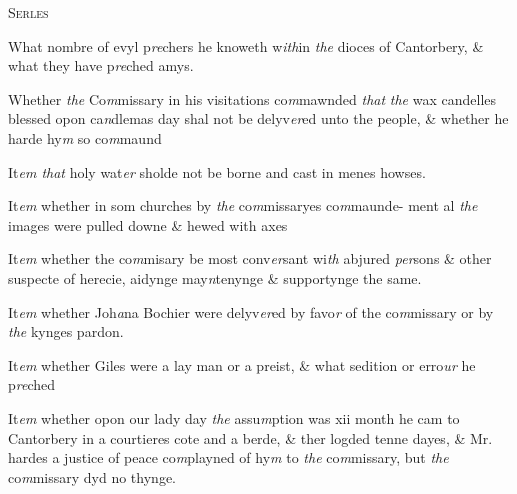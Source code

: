 \documentclass[12pt, a4paper]{book}
\begin{document}
				\begin{center} \begin{large} {\scshape Serles} \end{large} \end{center}
			
				
					
		\ifthenelse{\isodd{\thepage}}
		{\reversemarginpar}
		{\normalmarginpar}
		What nombre of evyl p\textit{re}chers he knoweth w\textit{ith}in \textit{the} dioces of
						Cantorbery, \& what they have p\textit{re}ched amys.
				
		\ifthenelse{\isodd{\thepage}}
		{\reversemarginpar}
		{\normalmarginpar}
		Whether \textit{the} Co\textit{m}missary in his visitations co\textit{m}mawnded \textit{that}
               \textit{the} wax candelles blessed opon ca\textit{n}dlemas day shal not be
 delyv\textit{er}ed unto the people, \& whether he harde hy\textit{m} so co\textit{m}maund
			

		\ifthenelse{\isodd{\thepage}}
		{\reversemarginpar}
		{\normalmarginpar}
		 It\textit{em that} holy wat\textit{er} sholde not be borne and cast in menes howses.
 
		\ifthenelse{\isodd{\thepage}}
		{\reversemarginpar}
		{\normalmarginpar}
		It\textit{em} whether in som churches by \textit{the} co\textit{m}missaryes co\textit{m}maunde-
 ment al \textit{the} images were pulled downe \& hewed with
 axes
 
		\ifthenelse{\isodd{\thepage}}
		{\reversemarginpar}
		{\normalmarginpar}
		It\textit{em} whether the co\textit{m}misary be most conv\textit{er}sant wi\textit{th} abjured
 \textit{per}sons \& other suspecte of herecie, aidynge may\textit{n}tenynge
 \& supportynge the same.
            		
		\ifthenelse{\isodd{\thepage}}
		{\reversemarginpar}
		{\normalmarginpar}
		 It\textit{em} whether Joh\textit{a}na Bochier were delyv\textit{er}ed by favo\textit{r} of
 the co\textit{m}missary or by \textit{the} kynges pardon.

		\ifthenelse{\isodd{\thepage}}
		{\reversemarginpar}
		{\normalmarginpar}
		 It\textit{em} whether Giles were a lay man or a preist, \& what
 sedition or erro\textit{ur} he p\textit{re}ched
 
		\ifthenelse{\isodd{\thepage}}
		{\reversemarginpar}
		{\normalmarginpar}
		It\textit{em} whether opon our lady day \textit{the} assu\textit{m}ption was xii month
 	he cam to Cantorbery in a courtieres cote and a berde, \& ther
 logded tenne dayes, \& Mr. hardes a justice of peace co\textit{m}playned
 of hy\textit{m} to \textit{the} co\textit{m}missary, but \textit{the} co\textit{m}missary dyd no thynge.
            		
\end{document}
